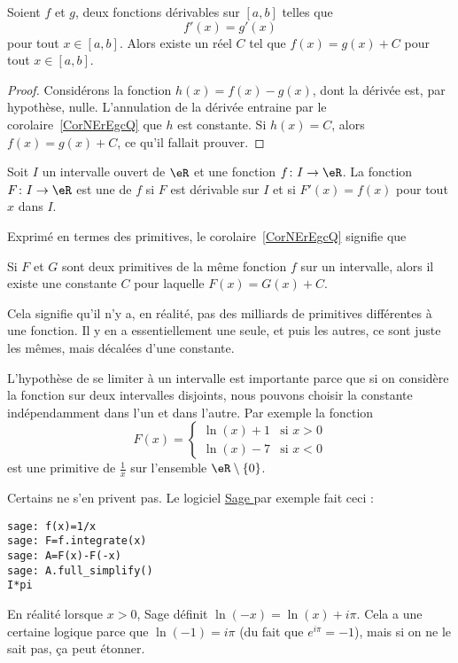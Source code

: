 \begin{corollary}   \label{CorNErEgcQ}
    Soient $f$ et $g$, deux fonctions dérivables sur $[a,b]$ telles que
    \begin{equation}
        f'(x) = g'(x)
    \end{equation}
    pour tout $x \in [a,b]$. Alors existe un réel $C$ tel que $f (x) = g (x) + C$ pour tout $x\in [a,b]$.
\end{corollary}

\begin{proof}
    Considérons la fonction $h(x)=f(x)-g(x)$, dont la dérivée est, par hypothèse, nulle. L'annulation de la dérivée entraine par le corolaire~\ref{CorNErEgcQ} que $h$ est  constante. Si $h(x)=C$, alors $f(x)=g(x)+C$, ce qu'il fallait prouver.
\end{proof}

\begin{definition}  \label{DefXVMVooWhsfuI}
    Soit \( I\) un intervalle ouvert de \( \eR\) et une fonction \( f\colon I\to \eR\). La fonction \( F\colon I\to \eR\) est une  de \( f\) si \( F\) est dérivable sur \( I\) et si \( F'(x)=f(x)\) pour tout \( x\) dans \( I\).
\end{definition}

Exprimé en termes des primitives, le corolaire~\ref{CorNErEgcQ} signifie que
\begin{corollary}  \label{CorZeroCst}
    Si $F$ et $G$ sont deux primitives de la même fonction $f$ sur un intervalle, alors il existe une constante $C$ pour laquelle $F(x)=G(x)+C$.
\end{corollary}
Cela signifie qu'il n'y a, en réalité, pas des milliards de primitives différentes à une fonction. Il y en a essentiellement une seule, et puis les autres, ce sont juste les mêmes, mais décalées d'une constante.

\begin{remark}
    L'hypothèse de se limiter à un intervalle est importante parce que si on considère la fonction sur deux intervalles disjoints, nous pouvons choisir la constante indépendamment dans l'un et dans l'autre. Par exemple la fonction
    \begin{equation}
        F(x)=\begin{cases}
            \ln(x)+1    &   \text{si } x>0\\
            \ln(x)-7    &    \text{si } x<0
        \end{cases}
    \end{equation}
    est une primitive de \( \frac{1}{ x }\) sur l'ensemble \( \eR\setminus\{ 0 \}\).

    Certains ne s'en privent pas. Le logiciel \href{https://www.sagemath.org}{ Sage } par exemple fait ceci :
    \begin{verbatim}
sage: f(x)=1/x
sage: F=f.integrate(x)
sage: A=F(x)-F(-x)
sage: A.full_simplify()
I*pi
    \end{verbatim}
    En réalité lorsque \( x>0\), Sage définit \( \ln(-x)=\ln(x)+i\pi\). Cela a une certaine logique parce que \( \ln(-1)=i\pi\) (du fait que \(  e^{i\pi}=-1\)), mais si on ne le sait pas, ça peut étonner.
\end{remark}

